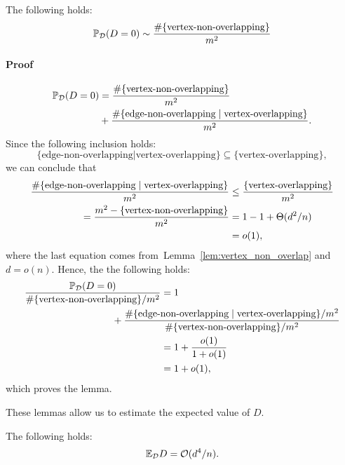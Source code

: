 \begin{lemma} \label{lem:prob_d_zero_equivalence}
  The following holds:
  \begin{equation}
  {\mathbb{P}}_{\cal D}(D = 0) \sim \frac{\#\{\text{vertex-non-overlapping}\}}{m^2}
  \end{equation}
\end{lemma}
\parsec
\paragraph{Proof}
  \begin{align}
    {\mathbb{P}}_{\cal D}(D = 0) &= \frac{\#\{\text{vertex-non-overlapping}\}}{m^2} \\ \notag  
        &+ \frac{\#\{\text{edge-non-overlapping}\mid\text{vertex-overlapping}\}}{m^2}.
  \end{align}
  Since the following inclusion holds:
  \begin{equation}
    \{\text{edge-non-overlapping}|\text{vertex-overlapping}\} 
      \subseteq \{\text{vertex-overlapping}\},
  \end{equation}
  we can conclude that
  \begin{align}
    \frac{\#\{\text{edge-non-overlapping}\mid\text{vertex-overlapping}\}}{m^2} 
      &\le \frac{\{\text{vertex-overlapping}\}}{m^2} \notag \\
        = \frac{m^2 - \{\text{vertex-non-overlapping}\}}{m^2} 
      &= 1 - 1 + \Theta(d^2/n) \notag \\
      &= o(1),
  \end{align}
where the last equation comes from~Lemma~\ref{lem:vertex_non_overlap} and
  $d =o(n)$.
  Hence, the the following holds:
  \begin{align}
    \frac{\Prob_\D(D = 0)}{\#\{\text{vertex-non-overlapping}\}/m^2} 
      &= 1 \\ \notag 
      &\!\!\!\!\!\!\!\!\!\!\!\!\!\!\!\!\!\!\!\!\!\!\!\!\!\!\!\!\!\!+ 
          \frac{\#\{\text{edge-non-overlapping}\mid\text{vertex-overlapping}\}/m^2}%
        {\#\{\text{vertex-non-overlapping}\}/m^2} \notag \\
      &= 1 + \frac{o(1)}{1 + o(1)} \notag \\
      &= 1 + o(1),
  \end{align}
  which proves the lemma.
\QEDA
\par
\medskip

These lemmas allow us to estimate the expected value of $D$. 

\begin{lemma}\label{lem:expct_d_asymptotics}
  The following holds:
  \begin{equation}
    \mathbb{E}_{\cal D} D = \mathcal{O}(d^4 / n).
  \end{equation}
\end{lemma}
\parsec
